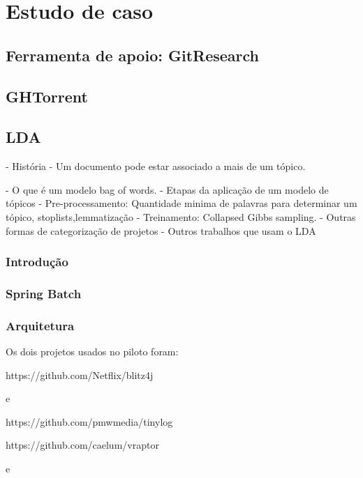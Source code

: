 \chapter{Estudo de caso}
\label{cap_estudo_caso}

\section{Ferramenta de apoio: GitResearch}
\label{cap_estudo_caso_ferramenta}


\section{GHTorrent}

\section{LDA}

- História
- Um documento pode estar associado a mais de um tópico.

- O que é um modelo bag of words.
- Etapas da aplicação de um modelo de tópicos
	- Pre-processamento:  Quantidade minima de palavras para determinar um tópico, stoplists,lemmatização
	- Treinamento: Collapsed  Gibbs sampling.
- Outras formas de categorização de projetos
- Outros trabalhos que usam o LDA	
 
 
 




\subsection{Introdução}
\subsection{Spring Batch}
\subsection{Arquitetura}



Os dois projetos usados no piloto foram:

https://github.com/Netflix/blitz4j

e

https://github.com/pmwmedia/tinylog



https://github.com/caelum/vraptor

e 

